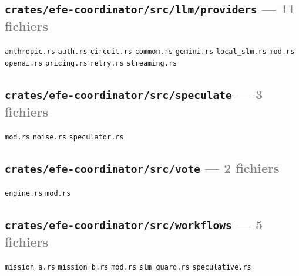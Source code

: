 \documentclass[10pt]{report}
\newcommand{\code}[1]{\texttt{\small #1}}
\begin{document}
\subsection*{\code{crates/efe-coordinator/src/llm/providers} \normalfont\textcolor{grey}{--- 11 fichiers}}
\begin{sloppypar}\footnotesize\raggedright
\code{anthropic.rs} \;\textbullet\; \code{auth.rs} \;\textbullet\; \code{circuit.rs} \;\textbullet\; \code{common.rs} \;\textbullet\; \code{gemini.rs} \;\textbullet\; \code{local\_slm.rs} \;\textbullet\; \code{mod.rs} \;\textbullet\; \code{openai.rs} \;\textbullet\; \code{pricing.rs} \;\textbullet\; \code{retry.rs} \;\textbullet\; \code{streaming.rs}
\end{sloppypar}

\subsection*{\code{crates/efe-coordinator/src/speculate} \normalfont\textcolor{grey}{--- 3 fichiers}}
\begin{sloppypar}\footnotesize\raggedright
\code{mod.rs} \;\textbullet\; \code{noise.rs} \;\textbullet\; \code{speculator.rs}
\end{sloppypar}

\subsection*{\code{crates/efe-coordinator/src/vote} \normalfont\textcolor{grey}{--- 2 fichiers}}
\begin{sloppypar}\footnotesize\raggedright
\code{engine.rs} \;\textbullet\; \code{mod.rs}
\end{sloppypar}

\subsection*{\code{crates/efe-coordinator/src/workflows} \normalfont\textcolor{grey}{--- 5 fichiers}}
\begin{sloppypar}\footnotesize\raggedright
\code{mission\_a.rs} \;\textbullet\; \code{mission\_b.rs} \;\textbullet\; \code{mod.rs} \;\textbullet\; \code{slm\_guard.rs} \;\textbullet\; \code{speculative.rs}
\end{sloppypar}
\end{document}
